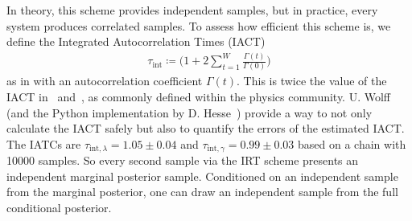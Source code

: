 \documentclass{article}
\begin{document}
In theory, this scheme provides independent samples, but in practice, every system produces correlated samples.
To assess how efficient this scheme is, we define the Integrated Autocorrelation Times (IACT)
\begin{align}
	\tau_{\text{int}}  \coloneqq  \Bigg(  1 + 2 \sum_{t = 1}^{W} \frac{\Gamma(t)}{\Gamma(0)}  \Bigg)  
\end{align} 
as in \cite{fox2016fast} with an autocorrelation coefficient $\Gamma(t)$.
This is twice the value of the IACT in~\cite[pp. 103-105]{wolff2002LecNot} and~\cite{wolff2004monte,drikHesse}, as commonly defined within the physics community.
U. Wolff~\cite{wolff2004monte} (and the Python implementation by D. Hesse~\cite{drikHesse}) provide a way to not only calculate the IACT safely but also to quantify the errors of the estimated IACT.
The IATCs are $\tau_{\text{int},\lambda} = 1.05\pm0.04$ and $\tau_{\text{int},\gamma} =0.99\pm0.03$ based on a chain with 10000 samples.
So every second sample via the IRT scheme presents an independent marginal posterior sample.
Conditioned on an independent sample from the marginal posterior, one can draw an independent sample from the full conditional posterior.
\end{document}
